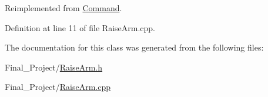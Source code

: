 Reimplemented from \hyperlink{classCommand_ae5846b4332a262e055c7a96759fa18f2}{Command}.



Definition at line 11 of file Raise\-Arm.\-cpp.



The documentation for this class was generated from the following files\-:\begin{DoxyCompactItemize}
\item 
Final\-\_\-\-Project/\hyperlink{RaiseArm_8h}{Raise\-Arm.\-h}\item 
Final\-\_\-\-Project/\hyperlink{RaiseArm_8cpp}{Raise\-Arm.\-cpp}\end{DoxyCompactItemize}
